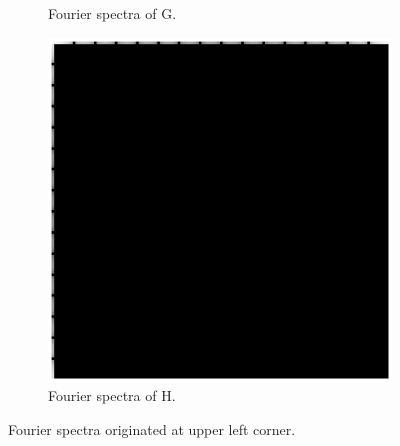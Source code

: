 \documentclass[11pt,a4paper]{article}
\begin{document}
\begin{figure}[!ht]
\begin{subfigure}[t]{.32\linewidth}
	\caption{Fourier spectra of G.}
	\label{fig:Ghat_Abs_Log}
	\end{subfigure}
	\begin{subfigure}[t]{.32\linewidth} %
	\includegraphics[width=.95\columnwidth]{Linearity_Hhat_Abs_Log.eps}
	\caption{Fourier spectra of H.}
	\label{fig:Hhat_Abs_Log}
	\end{subfigure}
	\caption{Fourier spectra originated at upper left corner.}
	\label{fig:spactrum}
\end{figure}
\end{document}

